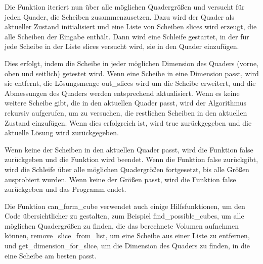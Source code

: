 \documentclass[a4paper,10pt,ngerman]{scrartcl}
\begin{document}
    Die Funktion iteriert nun über alle möglichen Quadergrößen und versucht für jeden Quader, die Scheiben zusammenzusetzen.
    Dazu wird der Quader als aktueller Zustand initialisiert und eine Liste von Scheiben slices wird erzeugt, die alle Scheiben der Eingabe enthält.
    Dann wird eine Schleife gestartet, in der für jede Scheibe in der Liste slices versucht wird, sie in den Quader einzufügen.

    Dies erfolgt, indem die Scheibe in jeder möglichen Dimension des Quaders (vorne, oben und seitlich) getestet wird.
    Wenn eine Scheibe in eine Dimension passt, wird sie entfernt, die Lösungsmenge out_slices wird um die Scheibe erweitert, und die Abmessungen des Quaders werden entsprechend aktualisiert. Wenn es keine weitere Scheibe gibt, die in den aktuellen Quader passt, wird der Algorithmus rekursiv aufgerufen, um zu versuchen, die restlichen Scheiben in den aktuellen Zustand einzufügen. Wenn dies erfolgreich ist, wird true zurückgegeben und die aktuelle Lösung wird zurückgegeben.

    Wenn keine der Scheiben in den aktuellen Quader passt, wird die Funktion false zurückgeben und die Funktion wird beendet.
    Wenn die Funktion false zurückgibt, wird die Schleife über alle möglichen Quadergrößen fortgesetzt, bis alle Größen ausprobiert wurden.
    Wenn keine der Größen passt, wird die Funktion false zurückgeben und das Programm endet.

    Die Funktion can_form_cube verwendet auch einige Hilfsfunktionen, um den Code übersichtlicher zu gestalten,
    zum Beispiel find_possible_cubes, um alle möglichen Quadergrößen zu finden, die das berechnete Volumen aufnehmen können, remove_slice_from_list, um eine Scheibe aus einer Liste zu entfernen, und get_dimension_for_slice, um die Dimension des Quaders zu finden, in die eine Scheibe am besten passt.
\end{document}
